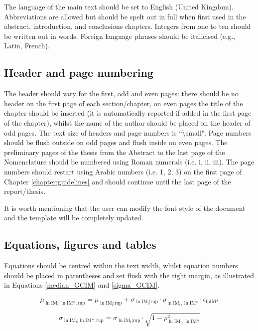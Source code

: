 The language of the main text should be set to English (United Kingdom). Abbreviations are allowed but should be spelt out in full when first used in the abstract, introduction, and conclusions chapters. Integers from one to ten should be written out in words. Foreign language phrases should be italicised (e.g., Latin, French).

\subsection{Header and page numbering}

The header should vary for the first, odd and even pages: there should be no header on the first page of each section/chapter, on even pages the title of the chapter should be inserted (it is automatically reported if added in the first page of the chapter), whilst the name of the author should be placed on the header of odd pages. The text size of headers and page numbers is ``\textbackslash small". Page numbers should be flush outside on odd pages and flush inside on even pages. The preliminary pages of the thesis from the Abstract to the last page of the Nomenclature should be numbered using Roman numerals (i.e. i, ii, iii).  The page numbers should restart using Arabic numbers (i.e. 1, 2, 3) on the first page of Chapter \ref{chapter:guidelines} and should continue until the last page of the report/thesis.

It is worth mentioning that the user can modify the font style of the document and the template will be completely updated.

\subsection{Equations, figures and tables}

Equations should be centred within the text width, whilst equation numbers should be placed in parentheses and set flush with the right margin, as illustrated in Equations \ref{median_GCIM} and \ref{sigma_GCIM}.

\begin{equation}
	\mu_{\ln \text{IM}_\text{i} | \ln \text{IM*}, \text{rup}} = \mu_{\ln \text{IM}_\text{i} | \text{rup}} + \sigma_{\ln \text{IM}_\text{i} | \text{rup}} \cdot \rho_{\ln \text{IM}_i, \ln \text{IM*}} \cdot \epsilon_{\ln \text{IM*}}
	\label{median_GCIM}
\end{equation}

\begin{equation}
	\sigma_{\ln \text{IM}_\text{i} | \ln \text{IM*}, \text{rup}} = \sigma_{\ln \text{IM}_\text{i} | \text{rup}} \cdot \sqrt{1 - \rho_{\ln \text{IM}_\text{i}, \ln \text{IM*}}^2}
	\label{sigma_GCIM}
\end{equation}

